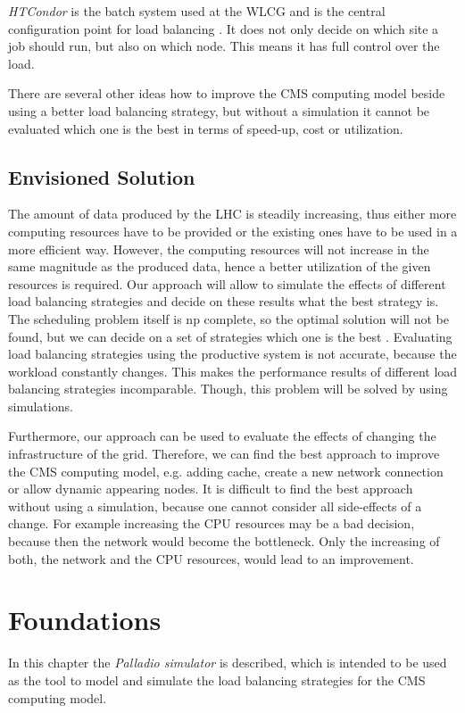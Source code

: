 \textit{HTCondor} is the batch system used at the WLCG and is the central configuration point for load balancing \cite{wlcg_update}.
It does not only decide on which site a job should run, but also on which node. This means it has full control over the load.

There are several other ideas how to improve the CMS computing model beside using a better load balancing strategy, but without a simulation it cannot be evaluated which one is the best in terms of speed-up, cost or utilization.


\section{Envisioned Solution} 
The amount of data produced by the LHC is steadily increasing, thus either more computing resources have to be provided or the existing ones have to be used in a more efficient way.
However, the computing resources will not increase in the same magnitude as the produced data, hence a better utilization of the given resources is required. Our approach will allow to simulate the effects of different load balancing strategies and decide on these results what the best strategy is. The scheduling problem itself is np complete, so the optimal solution will not be found, but we can decide on a set of strategies which one is the best \cite{1698650}. Evaluating load balancing strategies using the productive system is not accurate, because the workload constantly changes. This makes the performance results of different load balancing strategies incomparable. Though, this problem will be solved by using simulations.

Furthermore, our approach can be used to evaluate the effects of changing the infrastructure of the grid. Therefore, we can find the best approach to improve the CMS computing model, e.g. adding cache, create a new network connection or allow dynamic appearing nodes.
It is difficult to find the best approach without using a simulation, because one cannot consider all side-effects of a change. For example increasing the CPU resources may be a bad decision, because then the network would become the bottleneck. Only the increasing of both, the network and the CPU resources, would lead to an improvement.

\chapter {Foundations}
In this chapter the \textit{Palladio simulator} is described, which is intended to be used as the tool to model and simulate the load balancing strategies for the CMS computing model.

